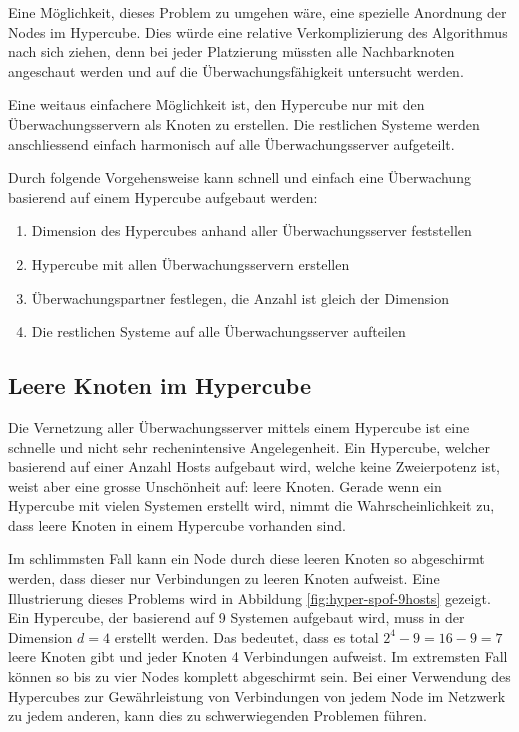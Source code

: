 Eine M\"oglichkeit, dieses Problem zu umgehen w\"are, eine spezielle Anordnung der Nodes im Hypercube. Dies w\"urde eine relative Verkomplizierung des Algorithmus nach sich ziehen, denn bei jeder Platzierung m\"ussten alle Nachbarknoten angeschaut werden und auf die \"Uberwachungsf\"ahigkeit untersucht werden.

Eine weitaus einfachere M\"oglichkeit ist, den Hypercube nur mit den \"Uberwachungsservern als Knoten zu erstellen. Die restlichen Systeme werden anschliessend einfach harmonisch auf alle \"Uberwachungsserver aufgeteilt.

Durch folgende Vorgehensweise kann schnell und einfach eine \"Uberwachung basierend auf einem Hypercube aufgebaut werden:
\begin{enumerate}
 \item Dimension des Hypercubes anhand aller \"Uberwachungsserver feststellen
 \item Hypercube mit allen \"Uberwachungsservern erstellen
 \item \"Uberwachungspartner festlegen, die Anzahl ist gleich der Dimension
 \item Die restlichen Systeme auf alle \"Uberwachungsserver aufteilen
\end{enumerate}

\subsection{Leere Knoten im Hypercube} \label{sec:theorie-fragmentierung-spof}
Die Vernetzung aller \"Uberwachungsserver mittels einem Hypercube ist eine schnelle und nicht sehr rechenintensive Angelegenheit. Ein Hypercube, welcher basierend auf einer Anzahl Hosts aufgebaut wird, welche keine Zweierpotenz ist, weist aber eine grosse Unsch\"onheit auf: leere Knoten. Gerade wenn ein Hypercube mit vielen Systemen erstellt wird, nimmt die Wahrscheinlichkeit zu, dass leere Knoten in einem Hypercube vorhanden sind.

Im schlimmsten Fall kann ein Node durch diese leeren Knoten so abgeschirmt werden, dass dieser nur Verbindungen zu leeren Knoten aufweist. Eine Illustrierung dieses Problems wird in Abbildung \ref{fig:hyper-spof-9hosts} gezeigt. Ein Hypercube, der basierend auf 9 Systemen aufgebaut wird, muss in der Dimension $d=4$ erstellt werden. Das bedeutet, dass es total $2^4 - 9 = 16 - 9 = 7$ leere Knoten gibt und jeder Knoten 4 Verbindungen aufweist. Im extremsten Fall k\"onnen so bis zu vier Nodes komplett abgeschirmt sein. Bei einer Verwendung des Hypercubes zur Gew\"ahrleistung von Verbindungen von jedem Node im Netzwerk zu jedem anderen, kann dies zu schwerwiegenden Problemen f\"uhren.

